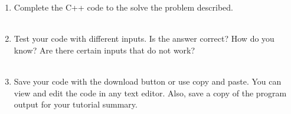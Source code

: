\documentclass[12pt]{article}
\begin{document}
\begin{description}[labelindent=1cm]
%
%	
%
%
%
%	
%	
%	
%	
%	
%	
%
%
%		

	\item[\textbf{\underline{Part 3 - Testing:}}] \hfill \vspace{0mm}
	\begin{enumerate}
	
		\item Complete the C++ code to the solve the problem described. \\\\
		
		\item Test your code with different inputs. Is the answer correct? How do you know? Are there certain inputs that do not work? \\\\
		
	
		\item Save your code with the download button or use copy and paste. You can view and edit the code in any text editor. Also, save a copy of the program output for your tutorial summary. \\\\

	\end{enumerate}

\newpage
\item[\textbf{\underline{Solution Code:}}] \hfill \vspace{0mm}
%
%
%
%


\end{description}
\end{document}
